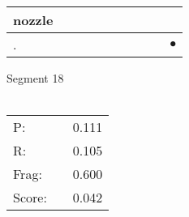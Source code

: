 \documentclass[landscape]{article}
\newcommand{\ssp}{\hspace{2pt}}
\newcommand{\mex}{\cellcolor{g}$\bullet$}
\begin{document}
\begin{tabular}{|l|p{10pt}|p{10pt}|p{10pt}|p{10pt}|p{10pt}|p{10pt}|p{10pt}|p{10pt}|p{10pt}|}
\hline
\ssp nozzle \ssp&\hspace{2pt}&\hspace{2pt}&\hspace{2pt}&\hspace{2pt}&\hspace{2pt}&\hspace{2pt}&\hspace{2pt}&\hspace{2pt}&\hspace{2pt}\\
\hline
\ssp \cellcolor{ref8}. \ssp&\hspace{2pt}&\hspace{2pt}&\hspace{2pt}&\hspace{2pt}&\hspace{2pt}&\hspace{2pt}&\hspace{2pt}&\hspace{2pt}&\hspace{2pt}\mex\\
\hline
\end{tabular}

\vspace{6pt}
\noindent Segment 18\\\\
\noindent\begin{tabular}{lm{12pt}r}
\hline
P:&&0.111\\
R:&&0.105\\
Frag:&&0.600\\
Score:&&0.042\\
\end{tabular}

\newpage
\end{document}
